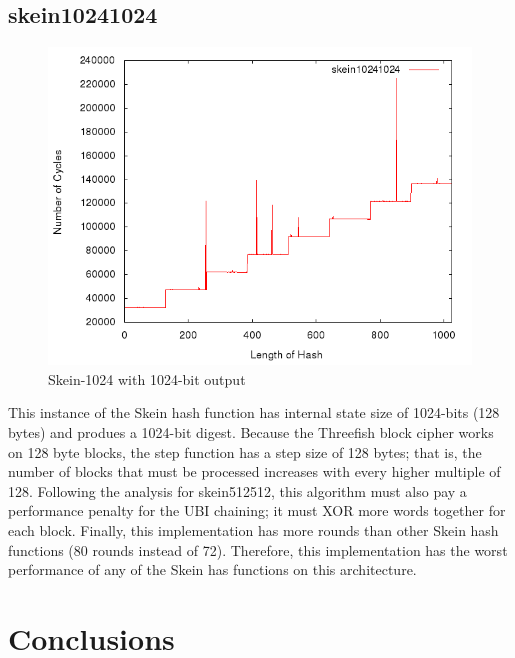 \documentclass[10pt,a4paper]{article}
\begin{document}
\subsection{skein10241024}
    \begin{figure}[H]
        \begin{center}
            \includegraphics[scale=0.5]{images/skein10241024.png} 
            \caption{Skein-1024 with 1024-bit output}
        \end{center}
    \end{figure}

This instance of the Skein hash function has internal state size of 1024-bits (128 bytes) and produes a 1024-bit digest.  Because the Threefish block cipher works on 128 byte blocks, the step function has a step size of 128 bytes; that is, the number of blocks that must be processed increases with every higher multiple of 128.  Following the analysis for skein512512, this algorithm must also pay a performance penalty for the UBI chaining; it must XOR more words together for each block.  Finally, this implementation has more rounds than other Skein hash functions (80 rounds instead of 72).  Therefore, this implementation has the worst performance of any of the Skein has functions on this architecture.

\section*{Conclusions}

{}

\end{document}
